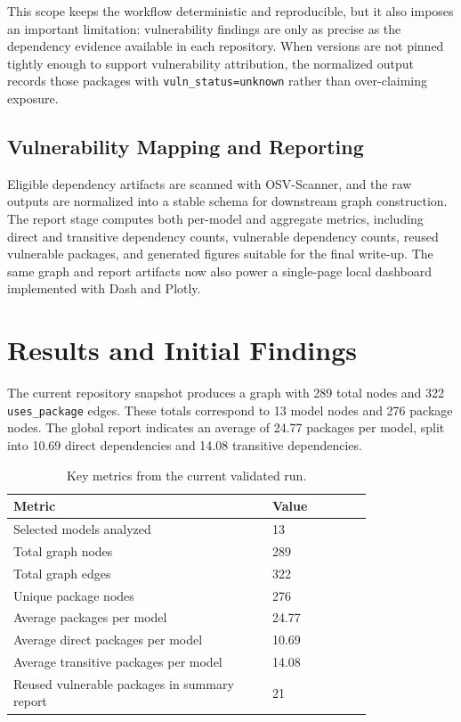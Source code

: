 \documentclass[11pt]{article}
\begin{document}
This scope keeps the workflow deterministic and reproducible, but it also imposes an important limitation: vulnerability findings are only as precise as the dependency evidence available in each repository. When versions are not pinned tightly enough to support vulnerability attribution, the normalized output records those packages with \texttt{vuln\_status=unknown} rather than over-claiming exposure.

\subsection{Vulnerability Mapping and Reporting}
Eligible dependency artifacts are scanned with OSV-Scanner, and the raw outputs are normalized into a stable schema for downstream graph construction. The report stage computes both per-model and aggregate metrics, including direct and transitive dependency counts, vulnerable dependency counts, reused vulnerable packages, and generated figures suitable for the final write-up. The same graph and report artifacts now also power a single-page local dashboard implemented with Dash and Plotly.

\section{Results and Initial Findings}
The current repository snapshot produces a graph with 289 total nodes and 322 \texttt{uses\_package} edges. These totals correspond to 13 model nodes and 276 package nodes. The global report indicates an average of 24.77 packages per model, split into 10.69 direct dependencies and 14.08 transitive dependencies.

\begin{table}[H]
\centering
\caption{Key metrics from the current validated run.}
\label{tab:key-metrics}
\begin{tabular}{p{0.58\linewidth} p{0.22\linewidth}}
\toprule
\textbf{Metric} & \textbf{Value} \\
\midrule
Selected models analyzed & 13 \\
Total graph nodes & 289 \\
Total graph edges & 322 \\
Unique package nodes & 276 \\
Average packages per model & 24.77 \\
Average direct packages per model & 10.69 \\
Average transitive packages per model & 14.08 \\
Reused vulnerable packages in summary report & 21 \\
\bottomrule
\end{tabular}
\end{table}
\end{document}
